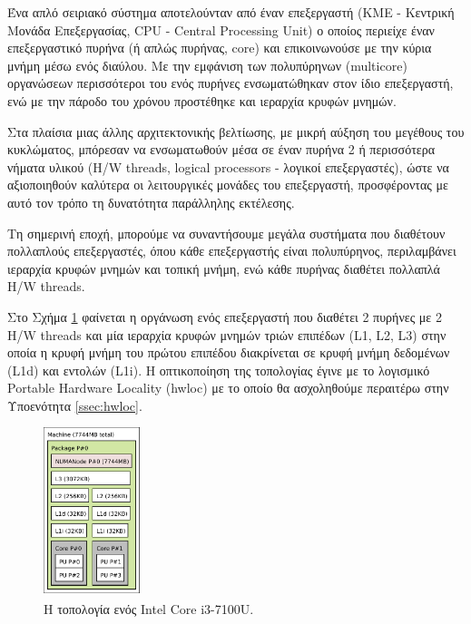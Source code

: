 Ένα απλό σειριακό σύστημα αποτελούνταν από έναν επεξεργαστή (ΚΜΕ - Κεντρική Μονάδα Επεξεργασίας, CPU - Central Processing Unit) ο οποίος περιείχε έναν επεξεργαστικό πυρήνα (ή απλώς πυρήνας, core) και επικοινωνούσε με την κύρια μνήμη μέσω ενός διαύλου. Με την εμφάνιση των πολυπύρηνων (multicore) οργανώσεων περισσότεροι του ενός πυρήνες ενσωματώθηκαν στον ίδιο επεξεργαστή, ενώ με την πάροδο του χρόνου προστέθηκε και ιεραρχία κρυφών μνημών.

Στα πλαίσια μιας άλλης αρχιτεκτονικής βελτίωσης, με μικρή αύξηση του μεγέθους του κυκλώματος, μπόρεσαν να ενσωματωθούν μέσα σε έναν πυρήνα 2 ή περισσότερα νήματα υλικού (H/W threads, logical processors - λογικοί επεξεργαστές), ώστε να αξιοποιηθούν καλύτερα οι λειτουργικές μονάδες του επεξεργαστή, προσφέροντας με αυτό τον τρόπο τη δυνατότητα παράλληλης εκτέλεσης.

Τη σημερινή εποχή, μπορούμε να συναντήσουμε μεγάλα συστήματα που διαθέτουν πολλαπλούς επεξεργαστές, όπου κάθε επεξεργαστής είναι πολυπύρηνος, περιλαμβάνει ιεραρχία κρυφών μνημών και τοπική μνήμη, ενώ κάθε πυρήνας διαθέτει πολλαπλά H/W threads.

Στο Σχήμα \ref{fig:ideapad-topo} φαίνεται η οργάνωση ενός επεξεργαστή που διαθέτει 2 πυρήνες με 2 H/W threads και μία ιεραρχία κρυφών μνημών τριών επιπέδων (L1, L2, L3) στην οποία η κρυφή μνήμη του πρώτου επιπέδου διακρίνεται σε κρυφή μνήμη δεδομένων (L1d) και εντολών (L1i). Η οπτικοποίηση της τοπολογίας έγινε με το λογισμικό Portable Hardware Locality (hwloc) με το οποίο θα ασχοληθούμε περαιτέρω στην Υποενότητα \ref{ssec:hwloc}.

\begin{figure}[t]
	\centering
	\includegraphics[width=0.25\textwidth]{Figures/ideapad-topo.pdf}
	\linebreak
	\caption{Η τοπολογία ενός Intel\textsuperscript{\textregistered} Core\textsuperscript{\texttrademark} i3-7100U.}
	\label{fig:ideapad-topo}
\end{figure}


